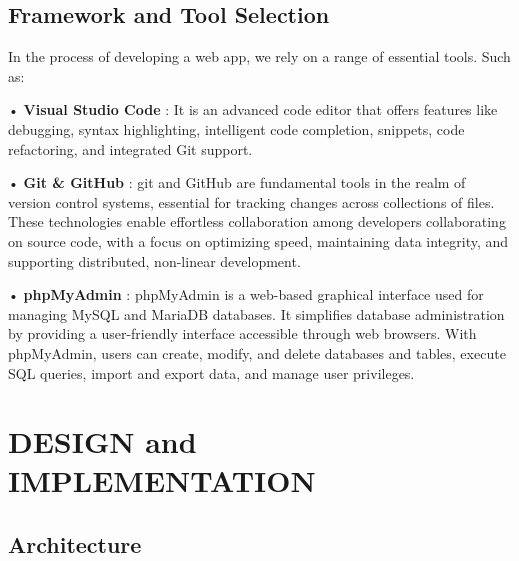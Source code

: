 \documentclass{nascproject}
\begin{document}
\section{Framework and Tool Selection}
In the process of developing a web app, we rely on a range of essential tools.
Such as:

• \textbf{Visual Studio Code} : It is an advanced code editor that offers features like debugging, syntax highlighting, intelligent code completion, snippets, code refactoring, and integrated Git support.

• \textbf{Git \& GitHub} : git and GitHub are fundamental tools in the realm of version control systems, essential for tracking changes across collections of files. These technologies enable effortless collaboration among developers collaborating on source code, with a focus on optimizing speed, maintaining data integrity, and supporting distributed, non-linear development.

• \textbf{phpMyAdmin} : phpMyAdmin is a web-based graphical interface used for managing MySQL and MariaDB databases. It simplifies database administration by providing a user-friendly interface accessible through web browsers. With phpMyAdmin, users can create, modify, and delete databases and tables, execute SQL queries, import and export data, and manage user privileges.


\chapter{DESIGN and IMPLEMENTATION}
\section{Architecture}
\end{document}
